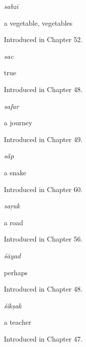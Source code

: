 \noindent\begin{minipage}[t]{\linewidth}
\raggedright
\textbf{}\enspace\emph{sabzī}\par
\small a vegetable, vegetables\par
\footnotesize Introduced in Chapter 52.
\end{minipage}\par\medskip

\noindent\begin{minipage}[t]{\linewidth}
\raggedright
\textbf{}\enspace\emph{sac}\par
\small true\par
\footnotesize Introduced in Chapter 48.
\end{minipage}\par\medskip

\noindent\begin{minipage}[t]{\linewidth}
\raggedright
\textbf{}\enspace\emph{safar}\par
\small a journey\par
\footnotesize Introduced in Chapter 49.
\end{minipage}\par\medskip

\noindent\begin{minipage}[t]{\linewidth}
\raggedright
\textbf{}\enspace\emph{sā̃p}\par
\small a snake\par
\footnotesize Introduced in Chapter 60.
\end{minipage}\par\medskip

\noindent\begin{minipage}[t]{\linewidth}
\raggedright
\textbf{}\enspace\emph{saṛak}\par
\small a road\par
\footnotesize Introduced in Chapter 56.
\end{minipage}\par\medskip

\noindent\begin{minipage}[t]{\linewidth}
\raggedright
\textbf{}\enspace\emph{śāyad}\par
\small perhaps\par
\footnotesize Introduced in Chapter 48.
\end{minipage}\par\medskip

\noindent\begin{minipage}[t]{\linewidth}
\raggedright
\textbf{}\enspace\emph{śikṣak}\par
\small a teacher\par
\footnotesize Introduced in Chapter 47.
\end{minipage}\par\medskip

